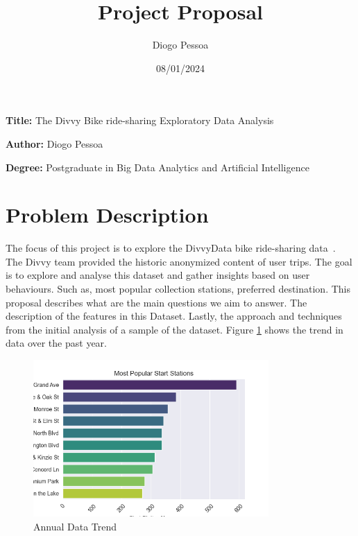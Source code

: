 \documentclass[12pt, a4paper]{article}
\title{Project Proposal}
\author{Diogo Pessoa}
\date{08/01/2024}
\newcommand{\namelistlabel}[1]{\mbox{#1}\hfil}
\newenvironment{namelist}[1]{%
    \begin{list}{}
    {
        \let\makelabel\namelistlabel
        \settowidth{\labelwidth}{#1}
        \setlength{\leftmargin}{1.1\labelwidth}
    }
    }{%
    \end{list}}
\begin{document}
    \maketitle
    \begin{namelist}{xxxxxxxxxxxx}
        \item[\textbf{Title:}]
        The Divvy Bike ride-sharing Exploratory Data Analysis
        \item[\textbf{Author:}]
        Diogo Pessoa
        \item[\textbf{Degree:}]
        Postgraduate in Big Data Analytics and Artificial Intelligence
    \end{namelist}

    \section*{Problem Description}
    \label{sec:ProblemDescription}
    The focus of this project is to explore the DivvyData bike ride-sharing data~\cite{DivvyData}.\newline
    The Divvy team provided the historic anonymized content of user trips.
    The goal is to explore and analyse this dataset and gather insights based on user behaviours.
    Such as, most popular collection stations, preferred destination. This proposal describes what are the main questions we aim to answer.
    The description of the features in this Dataset. Lastly, the approach and techniques from the initial analysis of a sample of the dataset.
    Figure \ref{fig:graph1} shows the trend in data over the past year.

    \begin{figure}[htbp]
        \centering
        \includegraphics[width=0.8\textwidth]{images/count_most_popular_start_stations}
        \caption{Annual Data Trend}
        \label{fig:graph1}
    \end{figure}
\end{document}
